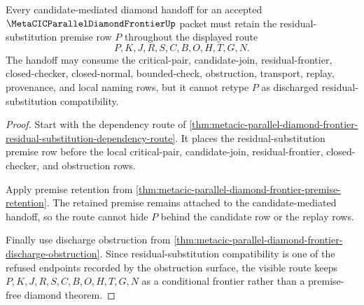\begin{theorem}
\label{thm:metacic-parallel-diamond-frontier-residual-substitution-retained-premise}
Every candidate-mediated diamond handoff for an accepted $\MetaCICParallelDiamondFrontierUp$ packet must retain the residual-substitution premise row $P$ throughout the displayed route
$$
P,K,J,R,S,C,B,O,H,T,G,N .
$$
The handoff may consume the critical-pair, candidate-join, residual-frontier, closed-checker, closed-normal, bounded-check, obstruction, transport, replay, provenance, and local naming rows, but it cannot retype $P$ as discharged residual-substitution compatibility.
\end{theorem}
\begin{proof}
Start with the dependency route of \autoref{thm:metacic-parallel-diamond-frontier-residual-substitution-dependency-route}. It places the residual-substitution premise row before the local critical-pair, candidate-join, residual-frontier, closed-checker, and obstruction rows.

Apply premise retention from \autoref{thm:metacic-parallel-diamond-frontier-premise-retention}. The retained premise remains attached to the candidate-mediated handoff, so the route cannot hide $P$ behind the candidate row or the replay rows.

Finally use discharge obstruction from \autoref{thm:metacic-parallel-diamond-frontier-discharge-obstruction}. Since residual-substitution compatibility is one of the refused endpoints recorded by the obstruction surface, the visible route keeps $P,K,J,R,S,C,B,O,H,T,G,N$ as a conditional frontier rather than a premise-free diamond theorem.
\end{proof}

